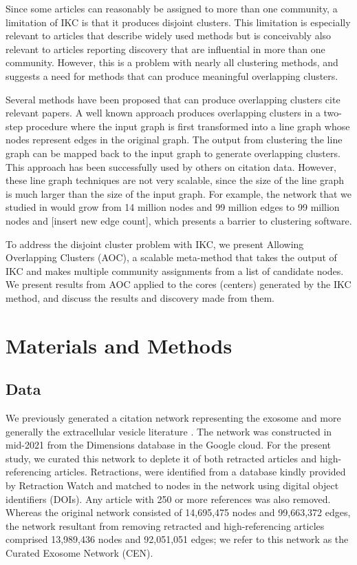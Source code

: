 \documentclass[11pt, oneside]{article}   	%
\begin{document}
Since some articles can reasonably be assigned to more than one community, a limitation of IKC is that  it produces disjoint clusters. This limitation is especially relevant to articles that describe widely used methods but is conceivably also relevant to articles reporting discovery that are influential in more than one community.   However, this is a problem with nearly all clustering methods, and suggests a need for methods that can produce meaningful overlapping clusters. 

Several methods have been proposed that can produce overlapping clusters cite relevant papers. A well known approach produces overlapping clusters  in a two-step procedure where the input graph is first transformed into a line graph \citep{Harary1960} whose nodes represent edges in the original graph.  The output from clustering the line graph can be mapped back to the input graph to generate overlapping clusters. This approach has been successfully used by others \citep{Evans2009,Havemann2021} on citation data. However, these line graph  techniques are not very scalable, since the size of the line graph is much larger than the size of the input graph. For example, the network that we studied in \cite{Wedell2022} would grow from 14 million nodes and 99 million edges to 99 million nodes and [insert new edge count], which presents a barrier to clustering software.
 
 To address the disjoint cluster problem with IKC, we present Allowing Overlapping Clusters (AOC), a scalable meta-method that takes the output of IKC and makes multiple community assignments from a list of candidate nodes. We present results from AOC applied to the cores (centers) generated by the IKC method, and discuss the results and discovery made from them.
 
\section{Materials and Methods}

\subsection{Data} We previously generated a citation network \citep{Wedell2022} representing the exosome \citep{harding1983} and more generally the extracellular vesicle literature \citep{raposo2021}. The network was constructed in mid-2021 from the Dimensions database \citep{hook2018dimensions} in the Google cloud. For the present study, we curated this network to deplete it of both retracted articles and high-referencing articles. Retractions, were identified from a database kindly provided by Retraction Watch and matched to nodes in the network using digital object identifiers (DOIs). Any article with 250 or more references was also removed. Whereas the original network consisted of 14,695,475 nodes and 99,663,372 edges, the network resultant from removing retracted and high-referencing articles comprised 13,989,436 nodes and 92,051,051 edges; we refer to this network as   the Curated Exosome Network (CEN).
\end{document}
